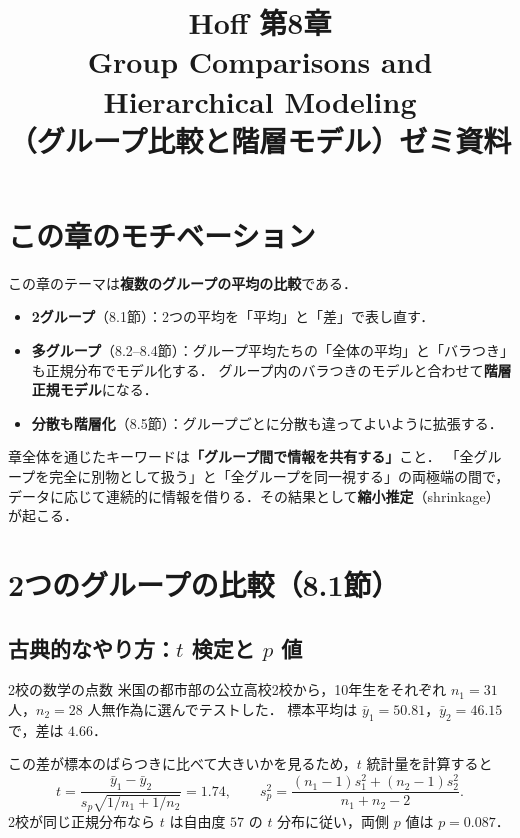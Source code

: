 \documentclass[lualatex,ja=standard,a4paper,12pt]{bxjsarticle}
\title{{\large Hoff 第8章} \\[6pt]
       \textbf{Group Comparisons and Hierarchical Modeling} \\[4pt]
       {\normalsize （グループ比較と階層モデル）ゼミ資料}}
\author{}
\date{}
\begin{document}
\maketitle
\thispagestyle{empty}

\section{この章のモチベーション}

この章のテーマは\textbf{複数のグループの平均の比較}である．
\begin{itemize}
  \item \textbf{2グループ}（8.1節）：2つの平均を「平均」と「差」で表し直す．
  \item \textbf{多グループ}（8.2--8.4節）：グループ平均たちの「全体の平均」と「バラつき」も正規分布でモデル化する．
        グループ内のバラつきのモデルと合わせて\textbf{階層正規モデル}になる．
  \item \textbf{分散も階層化}（8.5節）：グループごとに分散も違ってよいように拡張する．
\end{itemize}

\begin{pointbox}
章全体を通じたキーワードは\textbf{「グループ間で情報を共有する」}こと．
「全グループを完全に別物として扱う」と「全グループを同一視する」の両極端の間で，
データに応じて連続的に情報を借りる．その結果として\textbf{縮小推定}（shrinkage）が起こる．
\end{pointbox}

\section{2つのグループの比較（8.1節）}

\subsection{古典的なやり方：$t$ 検定と $p$ 値}

\begin{exbox}{2校の数学の点数}
米国の都市部の公立高校2校から，10年生をそれぞれ $n_1 = 31$ 人，$n_2 = 28$ 人無作為に選んでテストした．
標本平均は $\bar{y}_1 = 50.81$，$\bar{y}_2 = 46.15$ で，差は $4.66$．

\medskip
この差が標本のばらつきに比べて大きいかを見るため，$t$ 統計量を計算すると
\[
  t = \frac{\bar{y}_1 - \bar{y}_2}{s_p\sqrt{1/n_1 + 1/n_2}} = 1.74,
  \qquad
  s_p^2 = \frac{(n_1-1)s_1^2 + (n_2-1)s_2^2}{n_1 + n_2 - 2}.
\]
2校が同じ正規分布なら $t$ は自由度 $57$ の $t$ 分布に従い，両側 $p$ 値は $p = 0.087$．
\end{exbox}
\end{document}

